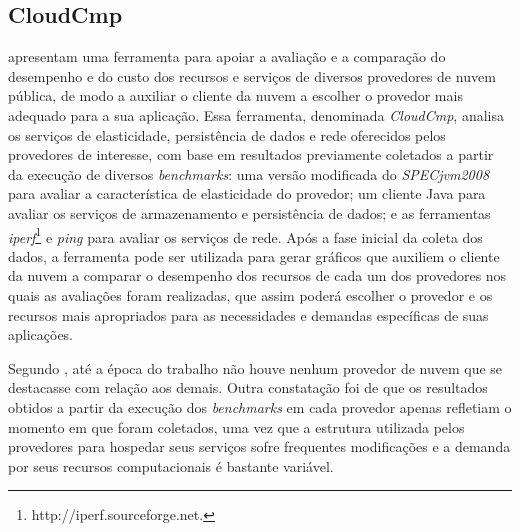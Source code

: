 \subsection{CloudCmp}
 apresentam uma ferramenta para apoiar a avaliação e a comparação do
desempenho e do custo dos recursos e serviços de diversos provedores de nuvem
pública, de modo a auxiliar o cliente da nuvem a escolher o provedor mais adequado para a sua
aplicação. Essa ferramenta, denominada {\em CloudCmp}, analisa
os serviços de elasticidade, persistência de dados e rede oferecidos pelos provedores
de interesse, com base em resultados previamente coletados a partir da execução de diversos
{\em benchmarks}: uma versão modificada do {\em SPECjvm2008}~\cite{SPECjvm2008}
para avaliar a característica de elasticidade do provedor; um cliente Java para avaliar os serviços de
armazenamento e persistência de dados; e as ferramentas {\em iperf}\footnote{http://iperf.sourceforge.net. }
e {\em ping} para avaliar os serviços de rede. Após a fase inicial da coleta dos dados, a ferramenta pode ser utilizada para gerar gráficos que auxiliem o
cliente da nuvem a comparar o desempenho dos recursos de cada um
dos provedores nos quais as avaliações foram realizadas, que assim poderá escolher o provedor e os recursos mais apropriados para as necessidades e demandas específicas de suas aplicações. 


Segundo , até a época do trabalho não houve
nenhum provedor de nuvem que se destacasse com relação aos demais. Outra constatação foi de que os resultados
obtidos a partir da execução dos {\em benchmarks} em cada provedor apenas refletiam o momento em que foram coletados, uma vez que a estrutura utilizada pelos provedores para hospedar seus serviços sofre frequentes modificações e a demanda por seus recursos computacionais é bastante variável.


